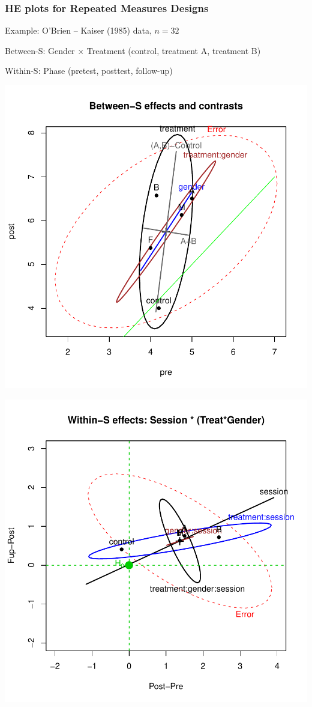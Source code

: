 \begin{frame}
  \frametitle{HE plots for Repeated Measures Designs}
Example:  O'Brien -- Kaiser (1985) data, $n=32$
	\begin{itemize*}
		\item Between-S:  Gender $\times$ Treatment (control, treatment A, treatment B)
		\item Within-S: Phase (pretest, posttest, follow-up)
	\end{itemize*}

\begin{center}
 \begin{minipage}[c]{.49\linewidth}
  \includegraphics[width=1\linewidth,clip]{fig/plot-obk-HE1}
 \end{minipage}%
 \hfill
 \begin{minipage}[c]{.49\linewidth}
  \includegraphics[width=1\linewidth,clip]{fig/plot-obk-HE3}

\end{minipage}
\end{center}
\end{frame}
